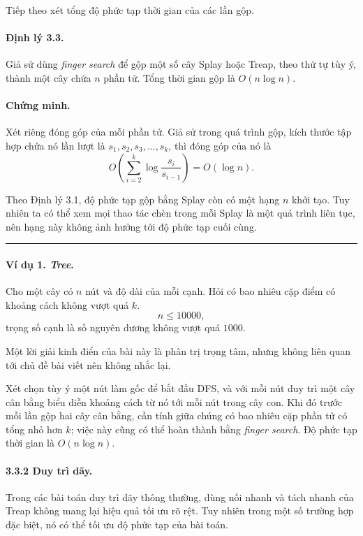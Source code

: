 \documentclass[11pt]{article}
\newcommand{\qedmark}{\hfill\rule{0.7ex}{0.7ex}}
\begin{document}
Tiếp theo xét tổng độ phức tạp thời gian của các lần gộp.

\paragraph{Định lý 3.3.}
Giả sử dùng \emph{finger search} để gộp một số cây Splay hoặc Treap, theo thứ
tự tùy ý, thành một cây chứa \(n\) phần tử. Tổng thời gian gộp là
\(O(n\log n)\).

\paragraph{Chứng minh.}
Xét riêng đóng góp của mỗi phần tử. Giả sử trong quá trình gộp, kích thước tập
hợp chứa nó lần lượt là \(s_1,s_2,s_3,\ldots,s_k\), thì đóng góp của nó là
\[
  O\left(\sum_{i=2}^{k}\log\frac{s_i}{s_{i-1}}\right)=O(\log n).
\]

Theo Định lý 3.1, độ phức tạp gộp bằng Splay còn có một hạng \(n\) khởi tạo.
Tuy nhiên ta có thể xem mọi thao tác chèn trong mỗi Splay là một quá trình liên
tục, nên hạng này không ảnh hưởng tới độ phức tạp cuối cùng. \qedmark

\paragraph{Ví dụ 1. \emph{Tree}.}
Cho một cây có \(n\) nút và độ dài của mỗi cạnh. Hỏi có bao nhiêu cặp điểm có
khoảng cách không vượt quá \(k\).
\[
  n\le 10000,
\]
trọng số cạnh là số nguyên dương không vượt quá \(1000\).

Một lời giải kinh điển của bài này là phân trị trọng tâm, nhưng không liên quan
tới chủ đề bài viết nên không nhắc lại.

Xét chọn tùy ý một nút làm gốc để bắt đầu DFS, và với mỗi nút duy trì một cây
cân bằng biểu diễn khoảng cách từ nó tới mỗi nút trong cây con. Khi đó trước
mỗi lần gộp hai cây cân bằng, cần tính giữa chúng có bao nhiêu cặp phần tử có
tổng nhỏ hơn \(k\); việc này cũng có thể hoàn thành bằng \emph{finger search}.
Độ phức tạp thời gian là \(O(n\log n)\).

\paragraph{3.3.2 Duy trì dãy.}
Trong các bài toán duy trì dãy thông thường, dùng nối nhanh và tách nhanh của
Treap không mang lại hiệu quả tối ưu rõ rệt. Tuy nhiên trong một số trường hợp
đặc biệt, nó có thể tối ưu độ phức tạp của bài toán.
\end{document}
